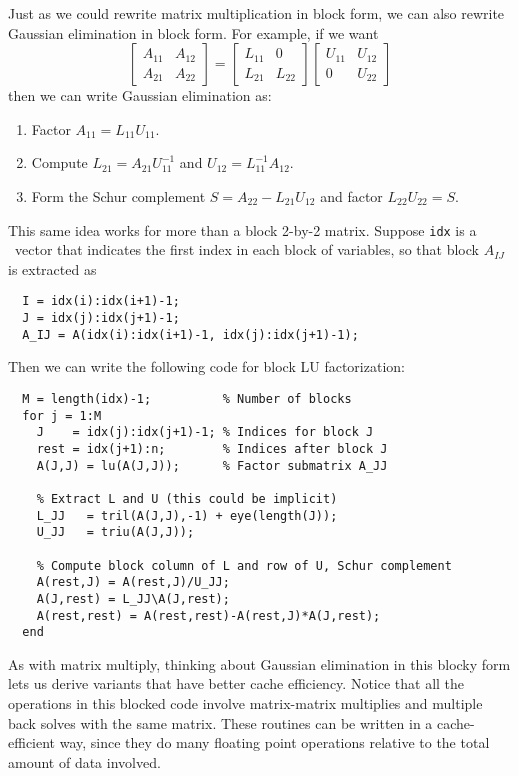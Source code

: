 \documentclass[12pt, leqno]{article}
\begin{document}
Just as we could rewrite matrix multiplication in block form, we can also
rewrite Gaussian elimination in block form.  For example, if we want
\[
  \begin{bmatrix} A_{11} & A_{12} \\ A_{21} & A_{22} \end{bmatrix} =
  \begin{bmatrix} L_{11} & 0 \\ L_{21} & L_{22} \end{bmatrix}
  \begin{bmatrix} U_{11} & U_{12} \\ 0 & U_{22} \end{bmatrix}
\]
then we can write Gaussian elimination as:
\begin{enumerate}
\item
  Factor $A_{11} = L_{11} U_{11}$.
\item
  Compute $L_{21} = A_{21} U_{11}^{-1}$ and $U_{12} = L_{11}^{-1} A_{12}$.
\item
  Form the Schur complement $S = A_{22} - L_{21} U_{12}$ and factor
  $L_{22} U_{22} = S$.
\end{enumerate}

This same idea works for more than a block 2-by-2 matrix.
Suppose {\tt idx} is a \matlab\ vector that indicates the first index
in each block of variables, so that block $A_{IJ}$ is extracted as
\begin{lstlisting}
  I = idx(i):idx(i+1)-1;
  J = idx(j):idx(j+1)-1;
  A_IJ = A(idx(i):idx(i+1)-1, idx(j):idx(j+1)-1);
\end{lstlisting}
Then we can write the following code for block LU factorization:
\begin{lstlisting}
  M = length(idx)-1;          % Number of blocks
  for j = 1:M
    J    = idx(j):idx(j+1)-1; % Indices for block J
    rest = idx(j+1):n;        % Indices after block J
    A(J,J) = lu(A(J,J));      % Factor submatrix A_JJ

    % Extract L and U (this could be implicit)
    L_JJ   = tril(A(J,J),-1) + eye(length(J));
    U_JJ   = triu(A(J,J));

    % Compute block column of L and row of U, Schur complement
    A(rest,J) = A(rest,J)/U_JJ;
    A(J,rest) = L_JJ\A(J,rest);
    A(rest,rest) = A(rest,rest)-A(rest,J)*A(J,rest);
  end
\end{lstlisting}

As with matrix multiply, thinking about Gaussian elimination in this
blocky form lets us derive variants that have better cache efficiency.
Notice that all the operations in this blocked code involve matrix-matrix
multiplies and multiple back solves with the same matrix.  These routines
can be written in a cache-efficient way, since they do many floating point
operations relative to the total amount of data involved.
\end{document}
